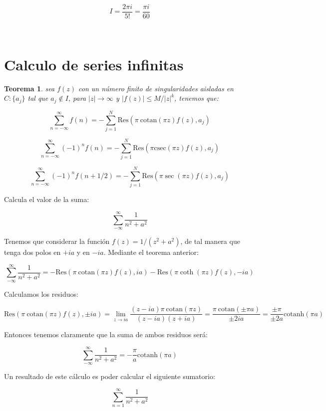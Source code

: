 \documentclass[12pt]{book}
\newcommand{\cotanh}{\mathrm{cotanh}}
\newcommand{\cotan}{\ \mathrm{cotan}}
\newcommand{\Res}{\mathrm{Res}}
\newtheorem{theorem}{Teorema}[section]
\begin{document}
$$ I = \frac{2 \pi i}{5 !} = \dfrac{\pi i}{60} $$


\hrulefill \\

\section{Calculo de series infinitas}

\begin{theorem}
sea $f(z)$ con un número finito de singularidades aisladas en $C:\{ a_j \}$ tal que $a_j \notin I$, para $|z| \longrightarrow \infty$ y $|f(z)| \leq M/|z|^k$, tenemos que:

$$ \sum_{n=-\infty}^\infty f(n) = - \sum_{j=1}^N \Res (\pi \cotan (\pi z) f(z), a_j ) $$

$$ \sum_{n=-\infty}^\infty (-1)^n f(n) = - \sum_{j=1}^N \Res (\pi \mathrm{csec} (\pi z) f(z), a_j )$$

$$ \sum_{n=-\infty }^{\infty} (-1)^n f(n+1/2) = - \sum_{j=1}^N \Res (\pi \sec (\pi z) f(z), a_j) $$

\end{theorem}




\hrulefill

Calcula el valor de la suma:

$$ \sum_{-\infty}^{\infty} \dfrac{1}{n^2+a^2} $$

Tenemos que considerar la función $f(z) = 1/(z^2+a^2)$, de tal manera que tenga dos polos en $+ia$ y en $-ia$. Mediante el teorema anterior:

 
$$ \sum_{-\infty}^{\infty} \dfrac{1}{n^2+a^2} = - \Res (\pi \cotan(\pi z) f(z), ia)  - \Res (\pi \coth(\pi z) f(z), -ia)    $$

Calculamos los residuos:

$$   \Res (\pi \cotan(\pi z) f(z), \pm ia) = \lim_{z \rightarrow ia} \dfrac{(z-ia) \pi \cotan(\pi z)}{(z-ia)(z+ia)} = \dfrac{ \pi \cotan (\pm \pi a)}{\pm 2ia} = \dfrac{\pm \pi}{\pm 2a} \cotanh ( \pi a)   $$

Entonces tenemos claramente que la suma de ambos residuos será:


$$ \sum_{-\infty}^{\infty} \dfrac{1}{n^2+a^2} = - \frac{\pi}{a} \cotanh(\pi a)$$

Un resultado de este cálculo es poder calcular el siguiente sumatorio:

$$ \sum_{n=1}^\infty  \dfrac{1}{n^2+a^2}$$
\end{document}

